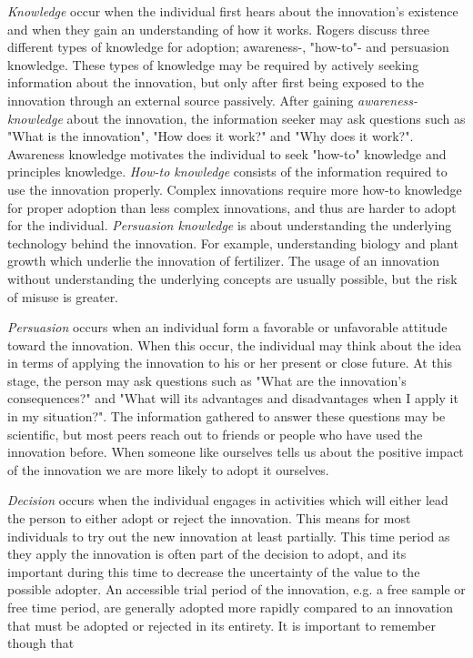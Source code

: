 \textit{Knowledge} occur when the individual first hears about the innovation's existence and when they gain an understanding of how it works. Rogers discuss three different types of knowledge for adoption; awareness-, "how-to"- and persuasion knowledge. These types of knowledge may be required by actively seeking information about the innovation, but only after first being exposed to the innovation through an external source passively. After gaining \textit{awareness-knowledge} about the innovation, the information seeker may ask questions such as "What is the innovation", "How does it work?" and "Why does it work?". Awareness knowledge motivates the individual to seek "how-to" knowledge and principles knowledge. \textit{How-to knowledge} consists of the information required to use the innovation properly. Complex innovations require more how-to knowledge for proper adoption than less complex innovations, and thus are harder to adopt for the individual. \textit{Persuasion knowledge} is about understanding the underlying technology behind the innovation. For example, understanding biology and plant growth which underlie the innovation of fertilizer. The usage of an innovation without understanding the underlying concepts are usually possible, but the risk of misuse is greater.

\textit{Persuasion} occurs when an individual form a favorable or unfavorable attitude toward the innovation. When this occur, the individual may think about the idea in terms of applying the innovation to his or her present or close future. At this stage, the person may ask questions such as "What are the innovation's consequences?" and "What will its advantages and disadvantages when I apply it in my situation?". The information gathered to answer these questions may be scientific, but most peers reach out to friends or people who have used the innovation before. When someone like ourselves tells us about the positive impact of the innovation we are more likely to adopt it ourselves.

\textit{Decision} occurs when the individual engages in activities which will either lead the person to either adopt or reject the innovation. This means for most individuals to try out the new innovation at least partially. This time period as they apply the innovation is often part of the decision to adopt, and its important during this time to decrease the uncertainty of the value to the possible adopter. An accessible trial period of the innovation, e.g. a free sample or free time period, are generally adopted more rapidly compared to an innovation that must be adopted or rejected in its entirety. It is important to remember though that

